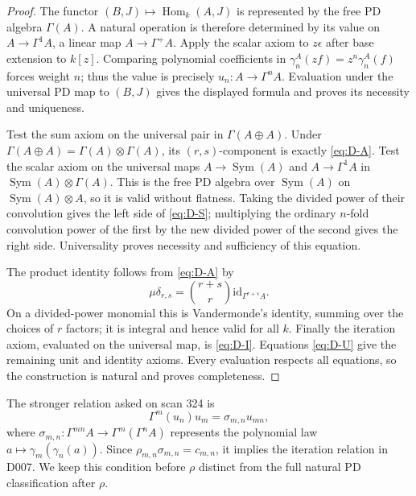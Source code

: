 \begin{proof}
The functor $(B,J)\mapsto\operatorname{Hom}_k(A,J)$ is represented
by the free PD algebra $\Gamma(A)$. A natural operation is therefore
determined by its value on $A\to\Gamma^1A$, a linear map
$A\to\Gamma^+A$. Apply the scalar axiom to $z\epsilon$ after base
extension to $k[z]$. Comparing polynomial coefficients in
$\gamma_n^A(zf)=z^n\gamma_n^A(f)$ forces weight $n$; thus the value
is precisely $u_n:A\to\Gamma^nA$. Evaluation under the universal
PD map to $(B,J)$ gives the displayed formula and proves its
necessity and uniqueness.

Test the sum axiom on the universal pair in $\Gamma(A\oplus A)$.
Under $\Gamma(A\oplus A)=\Gamma(A)\otimes\Gamma(A)$, its
$(r,s)$-component is exactly \eqref{eq:D-A}. Test the scalar axiom
on the universal maps $A\to\operatorname{Sym}(A)$ and
$A\to\Gamma^1A$ in $\operatorname{Sym}(A)\otimes\Gamma(A)$.
This is the free PD algebra over $\operatorname{Sym}(A)$ on
$\operatorname{Sym}(A)\otimes A$, so it is valid without flatness.
Taking the divided power of their convolution gives the left side
of \eqref{eq:D-S}; multiplying the ordinary $n$-fold convolution
power of the first by the new divided power of the second gives
the right side. Universality proves necessity and sufficiency of
this equation.

The product identity follows from \eqref{eq:D-A} by
\[
 \mu\delta_{r,s}=\binom{r+s}{r}\mathrm{id}_{\Gamma^{r+s}A}.
\]
On a divided-power monomial this is Vandermonde's identity, summing
over the choices of $r$ factors; it is integral and hence valid for
all $k$. Finally the iteration axiom, evaluated on the universal
map, is \eqref{eq:D-I}. Equations \eqref{eq:D-U} give the remaining
unit and identity axioms. Every evaluation respects all equations,
so the construction is natural and proves completeness.
\end{proof}

The stronger relation asked on scan 324 is
\begin{equation}\label{eq:D-strong}
 \Gamma^m(u_n)u_m=\sigma_{m,n}u_{mn},
\end{equation}
where $\sigma_{m,n}:\Gamma^{mn}A\to\Gamma^m(\Gamma^nA)$ represents
the polynomial law $a\mapsto\gamma_m(\gamma_n(a))$.
Since $\rho_{m,n}\sigma_{m,n}=c_{m,n}$, it implies the iteration
relation in D007. We keep this condition before $\rho$ distinct
from the full natural PD classification after $\rho$.


